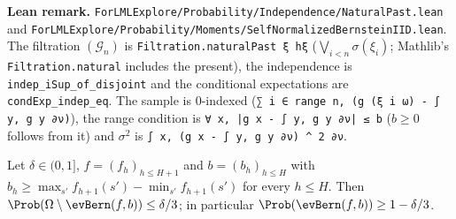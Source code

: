 \textbf{Lean remark.} \texttt{ForLMLExplore/Probability/Independence/NaturalPast.lean} and
\texttt{ForLMLExplore/Probability/Moments/SelfNormalizedBernsteinIID.lean}. The filtration $(\mathcal G_n)$
is \texttt{Filtration.naturalPast ξ hξ} ($\bigvee_{i < n} \sigma(\xi_i)$; Mathlib's
\texttt{Filtration.natural} includes the present), the independence is
\texttt{indep\_iSup\_of\_disjoint} and the conditional expectations are \texttt{condExp\_indep\_eq}.
The sample is $0$-indexed (\texttt{∑ i ∈ range n, (g (ξ i ω) - ∫ y, g y ∂ν)}), the range condition
is \texttt{∀ x, |g x - ∫ y, g y ∂ν| ≤ b} ($b \ge 0$ follows from it) and $\sigma^2$ is
\texttt{∫ x, (g x - ∫ y, g y ∂ν) \^{} 2 ∂ν}.

\begin{lemma}\label{lem:event_bern_prob}
\leanok
{}
Let $\delta \in (0, 1]$, $f = (f_h)_{h \le H + 1}$ and $b = (b_h)_{h \le H}$ with
$b_h \ge \max_{s'} f_{h+1}(s') - \min_{s'} f_{h+1}(s')$ for every $h \le H$. Then
$\Prob(\Omega \setminus \evBern(f, b)) \le \delta/3$; in particular $\Prob(\evBern(f, b)) \ge 1 - \delta/3$.
\end{lemma}

